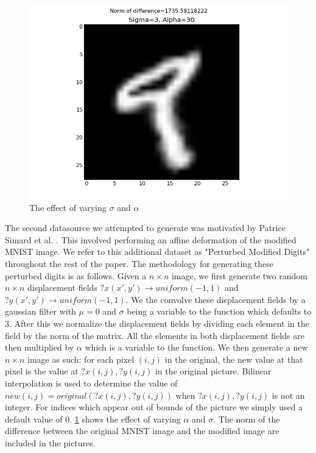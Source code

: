\documentclass[conference]{IEEEtran}
\begin{document}
\begin{figure}[h]
	\includegraphics[scale=0.30]{Sigma=3,Alpha=30.png}
	\caption{The effect of varying $\sigma$ and $\alpha$}
	\label{Perturbed}
\end{figure}

The second datasource we attempted to generate was motivated by Patrice Simard et al. \cite{Simard}. This involved performing an affine deformation of the modified MNIST image. We refer to this additional dataset as "Perturbed Modified Digits" throughout the rest of the paper. The methodology for generating these perturbed digits is as follows. Given a $n\times n$ image, we first generate two random $n\times n$ displacement fields $?x(x',y')\rightarrow uniform(-1,1)$ and $?y(x',y')\rightarrow uniform(-1,1)$. We the convolve these displacement fields by a gaussian filter with $\mu = 0$ and $\sigma$ being a variable to the function which defaults to 3. After this we normalize the displacement fields by dividing each element in the field by the norm of the matrix. All the elements in both displacement fields are then multiplied by $\alpha$ which is a variable to the function. We then generate a new $n\times n$ image as such: for each pixel $(i,j)$ in the original, the new value at that pixel is the value at $?x(i,j),?y(i,j)$ in the original picture. Bilinear interpolation is used to determine the value of $new(i,j)=original(?x(i,j),?y(i,j))$ when $?x(i,j),?y(i,j)$ is not an integer. For indices which appear out of bounds of the picture we simply used a default value of 0. \ref{Perturbed} shows the effect of varying $\alpha$ and $\sigma$. The norm of the difference between the original MNIST image and the modified image are included in the pictures.
\end{document}
